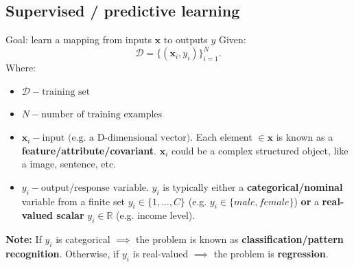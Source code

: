 \documentclass[12pt]{article}
\begin{document}
\subsection{Supervised / predictive learning}
Goal: learn a mapping from inputs \(\mathbf{x}\) to outputs \(y\)
\newline
Given:
\[
    \mathcal{D} = \lbrace (\mathbf{x}_i, y_i) \rbrace_{i=1}^{N}.
\]
\newline
Where:
\begin{itemize}
    \item \(\mathcal{D} - \text{training set}\)
    \item \(N - \text{number of training examples}\)
    \item \(\mathbf{x}_i - \text{input (e.g. a D-dimensional vector)}\). Each element \(\in \mathbf{x}\) is known as a \textbf{feature/attribute/covariant}. \(\mathbf{x}_i\) could be a complex structured object, like a image, sentence, etc.
    \item \(y_i - \text{output/response variable.}\) \(y_i\) is typically either a \textbf{categorical/nominal} variable from a finite set \(y_i \in \lbrace 1,\dots,C\rbrace\) (e.g. \(y_i \in \lbrace male, female \rbrace\)) \textbf{or} a \textbf{real-valued scalar} \(y_i \in \mathbb{R}\) (e.g. income level).
\end{itemize}
\bigskip
\textbf{Note:} If \(y_i\) is categorical \(\implies\) the problem is known as \textbf{classification/pattern recognition}. Otherwise, if \(y_i\) is real-valued \(\implies\) the problem is \textbf{regression}.
\end{document}
